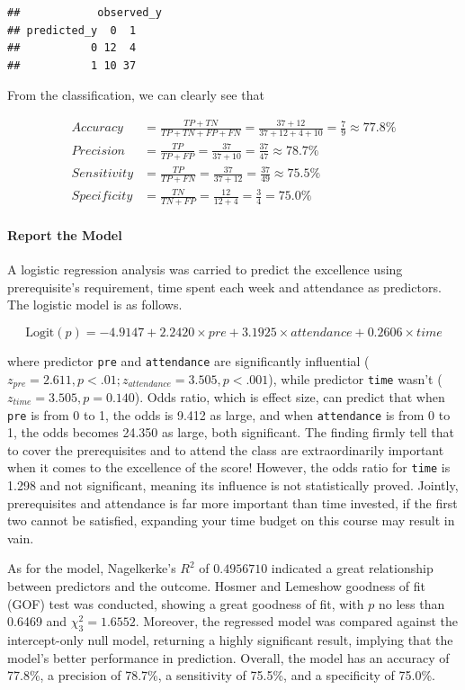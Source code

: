 \documentclass[
]{ctexart}
\begin{document}
\begin{verbatim}
##            observed_y
## predicted_y  0  1
##           0 12  4
##           1 10 37
\end{verbatim}

From the classification, we can clearly see that

\[
\begin{aligned}
Accuracy&=\frac{TP+TN}{TP+TN+FP+FN}=\frac{37+12}{37+12+4+10}=\frac{7}{9}\approx77.8\%\\
Precision&=\frac{TP}{TP+FP}=\frac{37}{37+10}=\frac{37}{47}\approx 78.7\%\\
Sensitivity&=\frac{TP}{TP+FN}=\frac{37}{37+12}=\frac{37}{49}\approx 75.5\%\\
Specificity&=\frac{TN}{TN+FP}=\frac{12}{12+4}=\frac{3}{4}=75.0\%
\end{aligned}
\]

\hypertarget{report-the-model}{%
\paragraph{Report the Model}\label{report-the-model}}

A logistic regression analysis was carried to predict the excellence
using prerequisite's requirement, time spent each week and attendance as
predictors. The logistic model is as follows.

\[
\text{Logit}(p)=-4.9147+2.2420\times pre+3.1925\times attendance+0.2606\times time
\]

where predictor \texttt{pre} and \texttt{attendance} are significantly
influential (\(z_{pre}=2.611,p<.01;z_{attendance}=3.505,p<.001\)), while
predictor \texttt{time} wasn't (\(z_{time} = 3.505,p=0.140\)). Odds
ratio, which is effect size, can predict that when \texttt{pre} is from
0 to 1, the odds is 9.412 as large, and when \texttt{attendance} is from
0 to 1, the odds becomes 24.350 as large, both significant. The finding
firmly tell that to cover the prerequisites and to attend the class are
extraordinarily important when it comes to the excellence of the score!
However, the odds ratio for \texttt{time} is 1.298 and not significant,
meaning its influence is not statistically proved. Jointly,
prerequisites and attendance is far more important than time invested,
if the first two cannot be satisfied, expanding your time budget on this
course may result in vain.

As for the model, Nagelkerke's \(R^2\) of \(0.4956710\) indicated a
great relationship between predictors and the outcome. Hosmer and
Lemeshow goodness of fit (GOF) test was conducted, showing a great
goodness of fit, with \(p\) no less than 0.6469 and \(\chi_3^2=1.6552\).
Moreover, the regressed model was compared against the intercept-only
null model, returning a highly significant result, implying that the
model's better performance in prediction. Overall, the model has an
accuracy of 77.8\%, a precision of 78.7\%, a sensitivity of 75.5\%, and
a specificity of 75.0\%.
\end{document}
